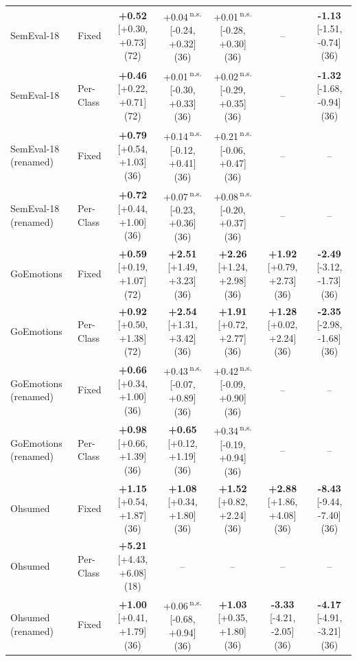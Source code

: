 \begin{tabular}{llccccc}
SemEval-18 & Fixed & \textbf{+0.52} {\scriptsize [+0.30, +0.73]} (72) & +0.04\,\textsuperscript{n.s.} {\scriptsize [-0.24, +0.32]} (36) & +0.01\,\textsuperscript{n.s.} {\scriptsize [-0.28, +0.30]} (36) & -- & \textbf{-1.13} {\scriptsize [-1.51, -0.74]} (36) \\
SemEval-18 & Per-Class & \textbf{+0.46} {\scriptsize [+0.22, +0.71]} (72) & +0.01\,\textsuperscript{n.s.} {\scriptsize [-0.30, +0.33]} (36) & +0.02\,\textsuperscript{n.s.} {\scriptsize [-0.29, +0.35]} (36) & -- & \textbf{-1.32} {\scriptsize [-1.68, -0.94]} (36) \\
SemEval-18 (renamed) & Fixed & \textbf{+0.79} {\scriptsize [+0.54, +1.03]} (36) & +0.14\,\textsuperscript{n.s.} {\scriptsize [-0.12, +0.41]} (36) & +0.21\,\textsuperscript{n.s.} {\scriptsize [-0.06, +0.47]} (36) & -- & -- \\
SemEval-18 (renamed) & Per-Class & \textbf{+0.72} {\scriptsize [+0.44, +1.00]} (36) & +0.07\,\textsuperscript{n.s.} {\scriptsize [-0.23, +0.36]} (36) & +0.08\,\textsuperscript{n.s.} {\scriptsize [-0.20, +0.37]} (36) & -- & -- \\
GoEmotions & Fixed & \textbf{+0.59} {\scriptsize [+0.19, +1.07]} (72) & \textbf{+2.51} {\scriptsize [+1.49, +3.23]} (36) & \textbf{+2.26} {\scriptsize [+1.24, +2.98]} (36) & \textbf{+1.92} {\scriptsize [+0.79, +2.73]} (36) & \textbf{-2.49} {\scriptsize [-3.12, -1.73]} (36) \\
GoEmotions & Per-Class & \textbf{+0.92} {\scriptsize [+0.50, +1.38]} (72) & \textbf{+2.54} {\scriptsize [+1.31, +3.42]} (36) & \textbf{+1.91} {\scriptsize [+0.72, +2.77]} (36) & \textbf{+1.28} {\scriptsize [+0.02, +2.24]} (36) & \textbf{-2.35} {\scriptsize [-2.98, -1.68]} (36) \\
GoEmotions (renamed) & Fixed & \textbf{+0.66} {\scriptsize [+0.34, +1.00]} (36) & +0.43\,\textsuperscript{n.s.} {\scriptsize [-0.07, +0.89]} (36) & +0.42\,\textsuperscript{n.s.} {\scriptsize [-0.09, +0.90]} (36) & -- & -- \\
GoEmotions (renamed) & Per-Class & \textbf{+0.98} {\scriptsize [+0.66, +1.39]} (36) & \textbf{+0.65} {\scriptsize [+0.12, +1.19]} (36) & +0.34\,\textsuperscript{n.s.} {\scriptsize [-0.19, +0.94]} (36) & -- & -- \\
Ohsumed & Fixed & \textbf{+1.15} {\scriptsize [+0.54, +1.87]} (36) & \textbf{+1.08} {\scriptsize [+0.34, +1.80]} (36) & \textbf{+1.52} {\scriptsize [+0.82, +2.24]} (36) & \textbf{+2.88} {\scriptsize [+1.86, +4.08]} (36) & \textbf{-8.43} {\scriptsize [-9.44, -7.40]} (36) \\
Ohsumed & Per-Class & \textbf{+5.21} {\scriptsize [+4.43, +6.08]} (18) & -- & -- & -- & -- \\
Ohsumed (renamed) & Fixed & \textbf{+1.00} {\scriptsize [+0.41, +1.79]} (36) & +0.06\,\textsuperscript{n.s.} {\scriptsize [-0.68, +0.94]} (36) & \textbf{+1.03} {\scriptsize [+0.35, +1.80]} (36) & \textbf{-3.33} {\scriptsize [-4.21, -2.05]} (36) & \textbf{-4.17} {\scriptsize [-4.91, -3.21]} (36) \\
\bottomrule
\end{tabular}
